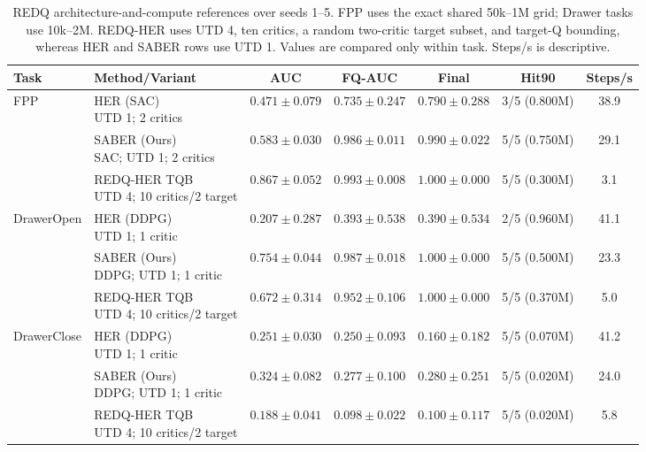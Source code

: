 \begin{table}[t]
\centering
\small
\setlength{\tabcolsep}{4pt}
\begin{tabular}{llccccc}
\toprule
Task & Method/Variant & AUC & FQ-AUC & Final & Hit90 & Steps/s \\
\midrule
FPP & \shortstack[l]{HER (SAC)\\UTD 1; 2 critics} & $0.471 \pm 0.079$ & $0.735 \pm 0.247$ & $0.790 \pm 0.288$ & 3/5 (0.800M) & 38.9 \\
 & \shortstack[l]{SABER (Ours)\\SAC; UTD 1; 2 critics} & $0.583 \pm 0.030$ & $0.986 \pm 0.011$ & $0.990 \pm 0.022$ & 5/5 (0.750M) & 29.1 \\
 & \shortstack[l]{REDQ-HER TQB\\UTD 4; 10 critics/2 target} & $0.867 \pm 0.052$ & $0.993 \pm 0.008$ & $1.000 \pm 0.000$ & 5/5 (0.300M) & 3.1 \\
\addlinespace[2pt]
DrawerOpen & \shortstack[l]{HER (DDPG)\\UTD 1; 1 critic} & $0.207 \pm 0.287$ & $0.393 \pm 0.538$ & $0.390 \pm 0.534$ & 2/5 (0.960M) & 41.1 \\
 & \shortstack[l]{SABER (Ours)\\DDPG; UTD 1; 1 critic} & $0.754 \pm 0.044$ & $0.987 \pm 0.018$ & $1.000 \pm 0.000$ & 5/5 (0.500M) & 23.3 \\
 & \shortstack[l]{REDQ-HER TQB\\UTD 4; 10 critics/2 target} & $0.672 \pm 0.314$ & $0.952 \pm 0.106$ & $1.000 \pm 0.000$ & 5/5 (0.370M) & 5.0 \\
\addlinespace[2pt]
DrawerClose & \shortstack[l]{HER (DDPG)\\UTD 1; 1 critic} & $0.251 \pm 0.030$ & $0.250 \pm 0.093$ & $0.160 \pm 0.182$ & 5/5 (0.070M) & 41.2 \\
 & \shortstack[l]{SABER (Ours)\\DDPG; UTD 1; 1 critic} & $0.324 \pm 0.082$ & $0.277 \pm 0.100$ & $0.280 \pm 0.251$ & 5/5 (0.020M) & 24.0 \\
 & \shortstack[l]{REDQ-HER TQB\\UTD 4; 10 critics/2 target} & $0.188 \pm 0.041$ & $0.098 \pm 0.022$ & $0.100 \pm 0.117$ & 5/5 (0.020M) & 5.8 \\
\bottomrule
\end{tabular}
\caption{REDQ architecture-and-compute references over seeds 1--5. FPP uses the exact shared 50k--1M grid; Drawer tasks use 10k--2M. REDQ-HER uses UTD 4, ten critics, a random two-critic target subset, and target-Q bounding, whereas HER and SABER rows use UTD 1. Values are compared only within task. Steps/s is descriptive.}
\label{tab:supp-redq-references}
\end{table}

